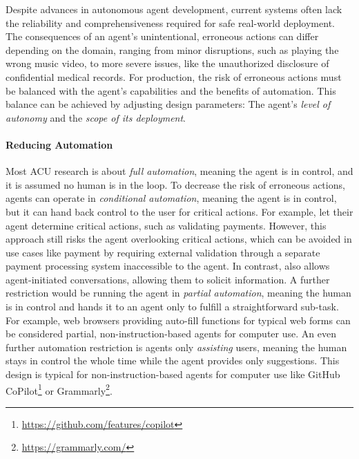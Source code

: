 Despite advances in autonomous agent development, current systems often lack the reliability and comprehensiveness required for safe real-world deployment.
The consequences of an agent's unintentional, erroneous actions can differ depending on the domain, ranging from minor disruptions, such as playing the wrong music video, to more severe issues, like the unauthorized disclosure of confidential medical records.
For production, the risk of erroneous actions must be balanced with the agent's capabilities and the benefits of automation.
This balance can be achieved by adjusting design parameters: The agent's \emph{level of autonomy} and the \emph{scope of its deployment}.


\paragraph{Reducing Automation}

Most ACU research is about \emph{full automation}, meaning the agent is in control, and it is assumed no human is in the loop.
To decrease the risk of erroneous actions, agents can operate in \emph{conditional automation}, meaning the agent is in control, but it can hand back control to the user for critical actions.
For example, \citet{li_appagent_2024} let their agent determine critical actions, such as validating payments. However, this approach still risks the agent overlooking critical actions, which can be avoided in use cases like payment by requiring external validation through a separate payment processing system inaccessible to the agent.
In contrast, \citet{wang_enabling_2023} also allows agent-initiated conversations, allowing them to solicit information.
A further restriction would be running the agent in \emph{partial automation}, meaning the human is in control and hands it to an agent only to fulfill a straightforward sub-task.
For example, web browsers providing auto-fill functions for typical web forms can be considered partial, non-instruction-based agents for computer use.
An even further automation restriction is agents only \emph{assisting} users, meaning the human stays in control the whole time while the agent provides only suggestions.
This design is typical for non-instruction-based agents for computer use like GitHub CoPilot\footnote{\url{https://github.com/features/copilot}} or Grammarly\footnote{\url{https://grammarly.com/}}.

